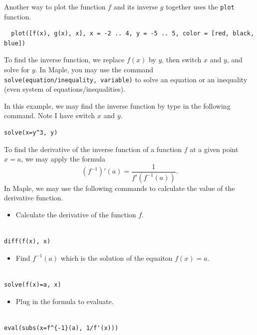 \documentclass[]{book}
\providecommand{\tightlist}{%
  \setlength{\itemsep}{0pt}\setlength{\parskip}{0pt}}
\theoremstyle{definition}
\theoremstyle{definition}
\theoremstyle{definition}
\theoremstyle{remark}
\begin{document}
Another way to plot the function \(f\) and its inverse \(g\) together uses the \texttt{plot} function.

\begin{verbatim}
  plot([f(x), g(x), x], x = -2 .. 4, y = -5 .. 5, color = [red, black, blue])
\end{verbatim}

To find the inverse function, we replace \(f(x)\) by \(y\), then switch \(x\) and \(y\), and solve for \(y\). In Maple, you may use the command \texttt{solve(equation/inequality,\ variable)} to solve an equation or an inequality (even system of equations/inequalities).

In this example, we may find the inverse function by type in the following command. Note I have switch \(x\) and \(y\).

\begin{verbatim}
solve(x=y^3, y)
\end{verbatim}

To find the derivative of the inverse function of a function \(f\) at a given point \(x=a\), we may apply the formula
\[(f^{-1})'(a)=\dfrac{1}{f'(f^{-1}(a))}.\]
In Maple, we may use the following commands to calculate the value of the derivative function.

\begin{itemize}
\tightlist
\item
  Calculate the derivative of the function \(f\).
\end{itemize}

\begin{verbatim}

diff(f(x), x)
\end{verbatim}

\begin{itemize}
\tightlist
\item
  Find \(f^{-1}(a)\) which is the solution of the equaiton \(f(x)=a\).
\end{itemize}

\begin{verbatim}

solve(f(x)=a, x)
\end{verbatim}

\begin{itemize}
\tightlist
\item
  Plug in the formula to evaluate.
\end{itemize}

\begin{verbatim}

eval(subs(x=f^{-1}(a), 1/f'(x)))
\end{verbatim}
\end{document}
